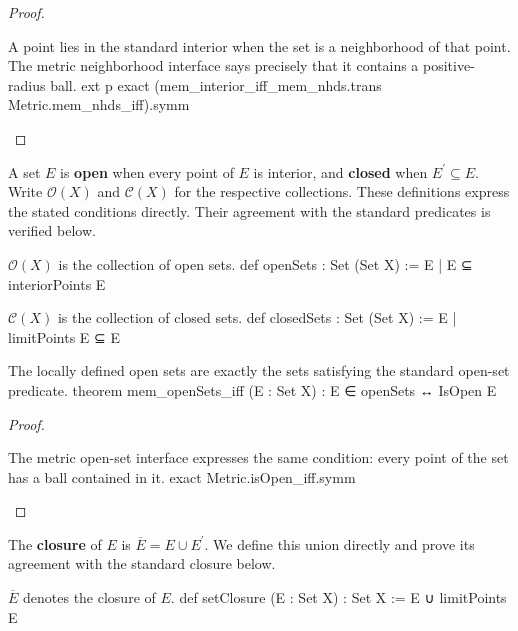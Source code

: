 \begin{proof}
  \begin{lean}{A point lies in the standard interior when the set is a neighborhood of that point. The metric neighborhood interface says precisely that it contains a positive-radius ball.}
    ext p
    exact (mem_interior_iff_mem_nhds.trans Metric.mem_nhds_iff).symm
  \end{lean}

\end{proof}

\begin{definition} \label{an1:def:open-closed-sets}
  A set $E$ is \textbf{open} when every point of $E$ is interior, and \textbf{closed} when $E^{\prime}\subseteq E$.
  Write $\mathcal O(X)$ and $\mathcal C(X)$ for the respective collections.
  These definitions express the stated conditions directly. Their agreement with the standard predicates is verified below.
  \begin{lean}{$\mathcal O(X)$ is the collection of open sets.}
    def openSets : Set (Set X) := {E | E ⊆ interiorPoints E}
  \end{lean}
  \begin{lean}{$\mathcal C(X)$ is the collection of closed sets.}
    def closedSets : Set (Set X) := {E | limitPoints E ⊆ E}
  \end{lean}
\end{definition}

\begin{lemma} \label{an1:lem:mem-openSets-iff}
  \begin{lean}{The locally defined open sets are exactly the sets satisfying the standard open-set predicate.}
    theorem mem_openSets_iff (E : Set X) : E ∈ openSets ↔ IsOpen E
  \end{lean}
\end{lemma}

\begin{proof}
  \begin{lean}{The metric open-set interface expresses the same condition: every point of the set has a ball contained in it.}
    exact Metric.isOpen_iff.symm
  \end{lean}

\end{proof}

\begin{definition} \label{an1:def:closure}
  The \textbf{closure} of $E$ is $\overline E=E\cup E^{\prime}$. We define this union directly and prove its agreement with the standard closure below.
  \begin{lean}{$\overline E$ denotes the closure of $E$.}
    def setClosure (E : Set X) : Set X := E ∪ limitPoints E
  \end{lean}
\end{definition}


